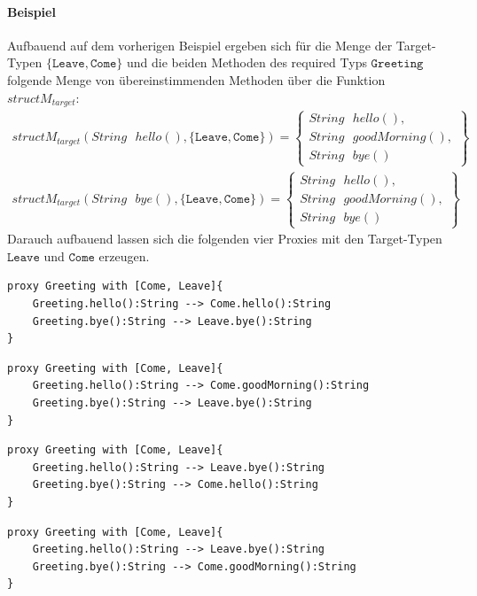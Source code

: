 \documentclass[a4paper,12pt]{article}
\newcommand{\methodForm}[3]
{
\mathit{#1}\texttt{ }\mathit{#2(#3)}  
}
\begin{document}
\paragraph{Beispiel}
Aufbauend auf dem vorherigen Beispiel ergeben sich für die Menge der Target-Typen  $\{\texttt{Leave}, \texttt{Come}\}$ und die beiden Methoden des required Typs $\texttt{Greeting}$ folgende Menge von übereinstimmenden Methoden über die Funktion $\mathit{structM_{target}}$:
\begin{gather*}
\mathit{structM_{target}(\methodForm{String}{hello}{},\{\texttt{Leave}, \texttt{Come}\})} = 
\left\{
\begin{array}{l}
\methodForm{String}{hello}{},\\
\methodForm{String}{goodMorning}{},\\
\methodForm{String}{bye}{}
\end{array}
\right\}\\
\mathit{structM_{target}(\methodForm{String}{bye}{},\{\texttt{Leave}, \texttt{Come}\})} = 
\left\{
\begin{array}{l}
\methodForm{String}{hello}{},\\
\methodForm{String}{goodMorning}{},\\
\methodForm{String}{bye}{}
\end{array}
\right\}
\end{gather*}
\noindent
Darauch aufbauend lassen sich die folgenden vier Proxies mit den Target-Typen $\texttt{Leave}$ und $\texttt{Come}$ erzeugen.
\begin{lstlisting}[style = dsl]
proxy Greeting with [Come, Leave]{
	Greeting.hello():String --> Come.hello():String
	Greeting.bye():String --> Leave.bye():String
}
\end{lstlisting}
\begin{lstlisting}[style = dsl]
proxy Greeting with [Come, Leave]{
	Greeting.hello():String --> Come.goodMorning():String
	Greeting.bye():String --> Leave.bye():String
}
\end{lstlisting}
\begin{lstlisting}[style = dsl]
proxy Greeting with [Come, Leave]{
	Greeting.hello():String --> Leave.bye():String
	Greeting.bye():String --> Come.hello():String
}
\end{lstlisting}
\begin{lstlisting}[style = dsl]
proxy Greeting with [Come, Leave]{
	Greeting.hello():String --> Leave.bye():String
	Greeting.bye():String --> Come.goodMorning():String
}
\end{lstlisting}
\noindent
\\\\
\end{document}
